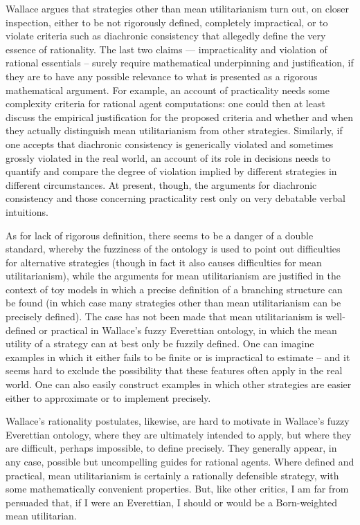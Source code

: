 \documentclass[aps,
pra,epsfig]{revtex4}
\begin{document}
Wallace argues that strategies other than
mean utilitarianism turn out, on closer inspection,
either to be not rigorously defined, completely impractical, or to violate
criteria such as diachronic consistency that allegedly define 
the very essence of rationality.  
The last two claims --- impracticality and violation of rational
essentials -- surely require mathematical underpinning and 
justification, if they are to have any possible relevance 
to what is presented as a rigorous
mathematical argument.   For example, an account of practicality  
needs some complexity criteria for rational agent
computations: one could then at least discuss the 
empirical justification for the proposed criteria and 
whether and when they actually distinguish
mean utilitarianism from other strategies.  
Similarly, if one accepts that diachronic consistency is 
generically violated and sometimes grossly
violated in the real world, an account of its role in decisions
needs to quantify and compare the degree of violation implied
by different strategies in different circumstances.  
At present, though, the arguments for diachronic consistency and
those concerning practicality rest only
on very debatable verbal intuitions.

As for lack of rigorous definition, there seems to be a danger of a double 
standard, whereby the fuzziness of the ontology is 
used to point out difficulties for alternative strategies (though
in fact it also causes difficulties for mean utilitarianism), while the 
arguments for mean utilitarianism are justified in the context of toy models 
in which a precise definition of a branching structure can be 
found (in which case many strategies other than mean utilitarianism
can be precisely defined).       
The case has not been made that mean utilitarianism is 
well-defined or practical in Wallace's fuzzy Everettian ontology, in which
the mean utility of a strategy can at best only be fuzzily defined.
One can imagine examples in which it either fails to be finite 
or is impractical to estimate -- and it 
seems hard to exclude the possibility that these features often
apply in the real world.  One can also easily 
construct examples in which other strategies are
easier either to approximate or to implement precisely.  
 
Wallace's rationality postulates, likewise, are hard to motivate
in Wallace's fuzzy Everettian ontology, where
they are ultimately intended to apply, but where they are 
difficult, perhaps impossible, to define precisely.  
They generally appear, in any case, possible but uncompelling
guides for rational agents.   Where defined and practical, mean 
utilitarianism is certainly a rationally defensible strategy, with 
some mathematically convenient properties.  But, like 
other critics\cite{pricevol, albertvol}, I am far from persuaded 
that, if I were an Everettian, I should or would be a Born-weighted mean utilitarian.  
\end{document}
